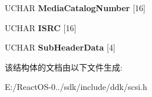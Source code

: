 \begin{DoxyCompactItemize}
U\+C\+H\+AR {\bfseries Media\+Catalog\+Number} \mbox{[}16\mbox{]}
\item 
\mbox{\label{struct___m_o_d_e___c_d_r_o_m___w_r_i_t_e___p_a_r_a_m_e_t_e_r_s___p_a_g_e2_abd2941903033b4872df84cfb5a628107}} 
U\+C\+H\+AR {\bfseries I\+S\+RC} \mbox{[}16\mbox{]}
\item 
\mbox{\label{struct___m_o_d_e___c_d_r_o_m___w_r_i_t_e___p_a_r_a_m_e_t_e_r_s___p_a_g_e2_a548d6f1ef19f56069fdd24d5eb19a6f6}} 
U\+C\+H\+AR {\bfseries Sub\+Header\+Data} \mbox{[}4\mbox{]}
\end{DoxyCompactItemize}


该结构体的文档由以下文件生成\+:\begin{DoxyCompactItemize}
\item 
E\+:/\+React\+O\+S-\/0../sdk/include/ddk/scsi.\+h\end{DoxyCompactItemize}
